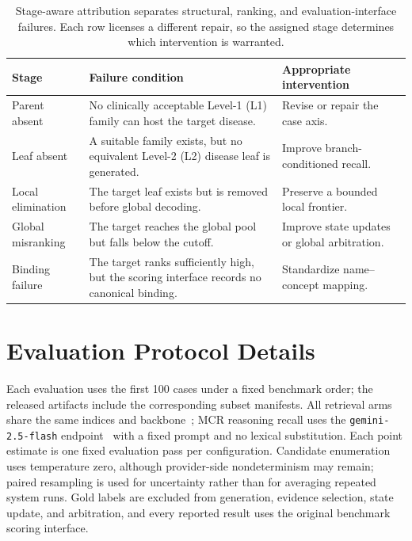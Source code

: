 \documentclass[letterpaper]{article}
\begin{document}
\begin{table}[t]
\centering
\small
\begin{tabular}{lp{7.4cm}p{4.3cm}}
\toprule
Stage & Failure condition & Appropriate intervention \\
\midrule
Parent absent & No clinically acceptable Level-1 (L1) family can host the target disease. & Revise or repair the case axis. \\
Leaf absent & A suitable family exists, but no equivalent Level-2 (L2) disease leaf is generated. & Improve branch-conditioned recall. \\
Local elimination & The target leaf exists but is removed before global decoding. & Preserve a bounded local frontier. \\
Global misranking & The target reaches the global pool but falls below the cutoff. & Improve state updates or global arbitration. \\
Binding failure & The target ranks sufficiently high, but the scoring interface records no canonical binding. & Standardize name--concept mapping. \\
\bottomrule
\end{tabular}
\caption{Stage-aware attribution separates structural, ranking, and evaluation-interface failures. Each row licenses a different repair, so the assigned stage determines which intervention is warranted.}
\label{tab:stages}
\end{table}

\section{Evaluation Protocol Details}

Each evaluation uses the first 100 cases under a fixed benchmark order; the released artifacts include the corresponding subset manifests.
All retrieval arms share the same indices and  backbone~\cite{llama33}; MCR reasoning recall uses the \texttt{gemini-2.5-flash} endpoint~\cite{gemini25flash} with a fixed prompt and no lexical substitution.
Each point estimate is one fixed evaluation pass per configuration.
Candidate enumeration uses temperature zero, although provider-side nondeterminism may remain; paired resampling is used for uncertainty rather than for averaging repeated system runs.
Gold labels are excluded from generation, evidence selection, state update, and arbitration, and every reported result uses the original benchmark scoring interface.
\end{document}
